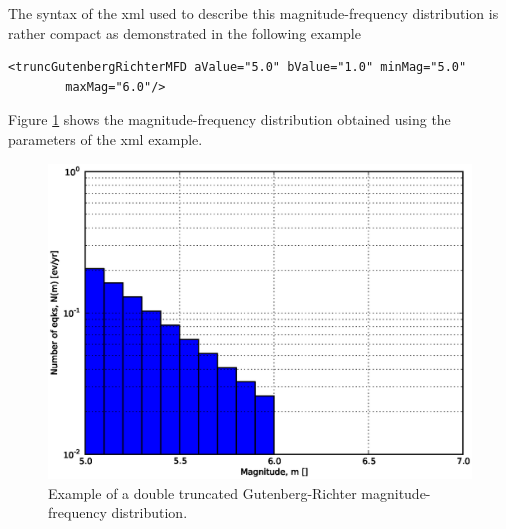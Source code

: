 \begin{description}
    The syntax of the xml used to describe this magnitude-frequency 
    distribution is rather compact as demonstrated in the following example
\begin{Verbatim}[frame=single, commandchars=\\\{\}, fontsize=\footnotesize]
<truncGutenbergRichterMFD aValue="5.0" bValue="1.0" minMag="5.0" 
        maxMag="6.0"/>
\end{Verbatim}
    Figure \ref{fig:dt_gr_mfd} shows the magnitude-frequency distribution 
    obtained using the parameters of the xml example.
\begin{figure}[!ht]
\centering
\includegraphics[width=12cm]{./figures/hazard/dt_mfd.eps}
\caption{Example of a double truncated Gutenberg-Richter 
magnitude-frequency distribution.}
\label{fig:dt_gr_mfd}
\end{figure}
%
%

\end{description}
